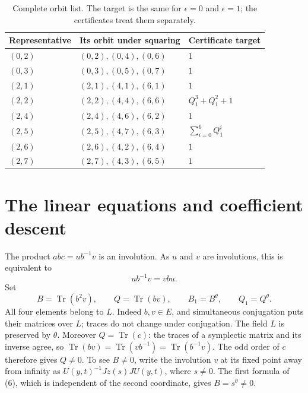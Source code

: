 \documentclass[11pt,a4paper]{article}
\newcommand{\Tr}{\operatorname{Tr}}
\begin{document}
\begin{table}[ht]
\centering
\begin{tabular}{lll}
\toprule
Representative & Its orbit under squaring & Certificate target\\
\midrule
$(0,2)$ & $(0,2),(0,4),(0,6)$ & $1$\\
$(0,3)$ & $(0,3),(0,5),(0,7)$ & $1$\\
$(2,1)$ & $(2,1),(4,1),(6,1)$ & $1$\\
$(2,2)$ & $(2,2),(4,4),(6,6)$ & $Q_1^3+Q_1^2+1$\\
$(2,4)$ & $(2,4),(4,6),(6,2)$ & $1$\\
$(2,5)$ & $(2,5),(4,7),(6,3)$ & $\sum_{i=0}^6Q_1^i$\\
$(2,6)$ & $(2,6),(4,2),(6,4)$ & $1$\\
$(2,7)$ & $(2,7),(4,3),(6,5)$ & $1$\\
\bottomrule
\end{tabular}
\caption{Complete orbit list. The target is the same for
$\epsilon=0$ and $\epsilon=1$; the certificates treat them separately.}
\label{orbits}
\end{table}

\section*{The linear equations and coefficient descent}

The product $abc=ub^{-1}v$ is an involution. As $u$ and $v$ are
involutions, this is equivalent to
\[
 ub^{-1}v=vbu.                                        \tag{8}
\]
Set
\[
 B=\Tr(b^2v),\qquad Q=\Tr(bv),\qquad
 B_1=B^\theta,\qquad Q_1=Q^\theta.                    \tag{9}
\]
All four elements belong to $L$. Indeed $b,v\in E$, and simultaneous
conjugation puts their matrices over $L$; traces do not change under
conjugation. The field $L$ is preserved by $\theta$.
Moreover $Q=\Tr(c)$: the traces of a symplectic matrix and its inverse
agree, so $\Tr(bv)=\Tr(vb^{-1})=\Tr(b^{-1}v)$.
The odd order of $c$ therefore gives $Q\ne0$.
To see $B\ne0$, write the involution $v$ at its fixed point away
from infinity as $U(y,t)^{-1}Jz(s)JU(y,t)$, where $s\ne0$.
The first formula of (6), which is independent of the second
coordinate, gives $B=s^\theta\ne0$.
\end{document}
